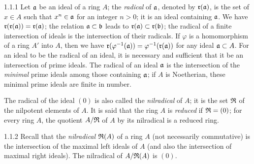 \documentclass[../main.tex]{subfiles}
\begin{document}
\begin{env}{1.1.1}
Let $\mathfrak{a}$ be an ideal of a ring $A$; the \emph{radical} of $\mathfrak{a}$, denoted
by $\mathfrak{r}(\mathfrak{a})$, is the set of $x\in A$ such that $x^n\in\mathfrak{a}$ for an integer $n>0$; it is an
ideal containing $\mathfrak{a}$. We have $\mathfrak{r}(\mathfrak{r}(\mathfrak{a}))=\mathfrak{r}(\mathfrak{a})$; the relation $\mathfrak{a}\subset\mathfrak{b}$
leads to $\mathfrak{r}(\mathfrak{a})\subset\mathfrak{r}(\mathfrak{b})$; the radical of a finite intersection of ideals is the
intersection of their radicals. If $\varphi$  is a homomorphism of a ring $A'$ into $A$, then we
have $\mathfrak{r}(\varphi^{-1}(\mathfrak{a}))=\varphi^{-1}(\mathfrak{r}(\mathfrak{a}))$
for any ideal $\mathfrak{a}\subset A$. For an ideal to be the radical of an ideal,
it is necessary and sufficient that it be an intersection of prime ideals. The radical of an
ideal $\mathfrak{a}$ is the intersection of the
\emph{minimal} prime ideals among those containing $\mathfrak{a}$; if $A$ is
Noetherian, these minimal prime ideals are finite in number.

The radical of the ideal $(0)$ is also called the \emph{nilradical} of $A$; it is the set
$\mathfrak{R}$ of the nilpotent elements of $A$. It is said that the ring $A$ is \emph{reduced} if
$\mathfrak{R}=(0)$; for every ring $A$, the quotient $A/\mathfrak{R}$ of $A$ by its nilradical is a
reduced ring.
\end{env}

\begin{env}{1.1.2}
Recall that the \emph{nilradical} $\mathfrak{R}(A)$ of a ring $A$ (not necessarily commutative) is the
intersection of the maximal left ideals of $A$ (and also the intersection of maximal
right ideals). The nilradical of $A/\mathfrak{R}(A)$ is $(0)$.
\end{env}
\end{document}
